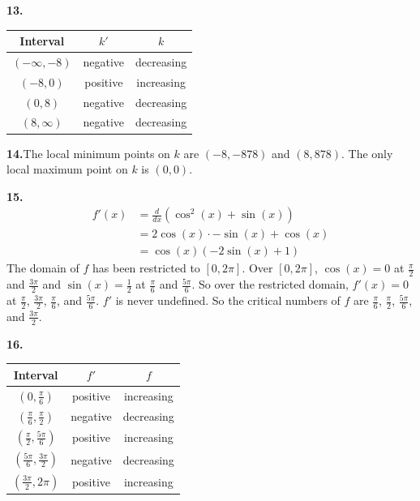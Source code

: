 \documentclass[10pt,oneside,]{book}
\theoremstyle{plain}
\theoremstyle{definition}
\numberwithin{equation}{section}
\newcommand{\fe}[2]{#1\mathopen{}\left(#2\right)\mathclose{}}
\newcommand{\cinterval}[2]{\left[#1,#2\right]}
\newcommand{\ointerval}[2]{\left(#1,#2\right)}
\newcommand{\point}[2]{\left(#1,#2\right)}
\newcommand{\fd}[1]{#1'}
\newcommand{\lzoo}[2]{{\frac{d}{d#1}}{\left(#2\right)}}
\begin{document}
\par\smallskip
\noindent\textbf{13.}\quad{}\begin{tabular}{ccc}
\toprule
Interval&\(\fd{k}\)&\(k\)\\
\midrule
\(\ointerval{-\infty}{-8}\)&negative&decreasing\\
\midrule
\(\ointerval{-8}{0}\)&positive&increasing\\
\midrule
\(\ointerval{0}{8}\)&negative&decreasing\\
\midrule
\(\ointerval{8}{\infty}\)&negative&decreasing\\
\bottomrule
\end{tabular}
\par\smallskip
\noindent\textbf{14.}\quad{}The local minimum points on \(k\) are \(\point{-8}{-878}\) and \(\point{8}{878}\).  The only local maximum point on \(k\) is \(\point{0}{0}\).%
\par\smallskip
\noindent\textbf{15.}\quad{}\begin{align*}
\fe{\fd{f}}{x}&=\lzoo{x}{\fe{\cos^2}{x}+\fe{\sin}{x}}\\
&=2\fe{\cos}{x}\cdot-\fe{\sin}{x}+\fe{\cos}{x}\\
&=\fe{\cos}{x}\left(-2\fe{\sin}{x}+1\right)
\end{align*}The domain of \(f\) has been restricted to \(\cinterval{0}{2\pi}\).  Over \(\cinterval{0}{2\pi}\), \(\fe{\cos}{x}=0\) at \(\frac{\pi}{2}\) and \(\frac{3\pi}{2}\) and \(\fe{\sin}{x}=\frac{1}{2}\) at \(\frac{\pi}{6}\) and \(\frac{5\pi}{6}\).  So over the restricted domain, \(\fe{\fd{f}}{x}=0\) at \(\frac{\pi}{2}\), \(\frac{3\pi}{2}\), \(\frac{\pi}{6}\), and \(\frac{5\pi}{6}\). \(\fd{f}\) is never undefined.  So the critical numbers of \(f\) are \(\frac{\pi}{6}\), \(\frac{\pi}{2}\), \(\frac{5\pi}{6}\), and \(\frac{3\pi}{2}\).%
\par\smallskip
\noindent\textbf{16.}\quad{}\begin{tabular}{ccc}
\toprule
Interval&\(\fd{f}\)&\(f\)\\
\midrule
\(\ointerval{0}{\frac{\pi}{6}}\)&positive&increasing\\
\midrule
\(\ointerval{\frac{\pi}{6}}{\frac{\pi}{2}}\)&negative&decreasing\\
\midrule
\(\ointerval{\frac{\pi}{2}}{\frac{5\pi}{6}}\)&positive&increasing\\
\midrule
\(\ointerval{\frac{5\pi}{6}}{\frac{3\pi}{2}}\)&negative&decreasing\\
\midrule
\(\ointerval{\frac{3\pi}{2}}{2\pi}\)&positive&increasing\\
\midrule
\end{tabular}
\end{document}

